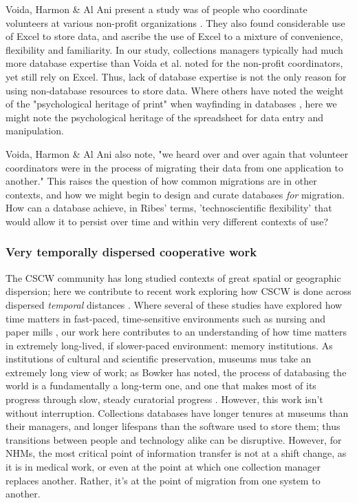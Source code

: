 Voida, Harmon & Al Ani present a study was of people who coordinate volunteers at various non-profit organizations \cite{voida2011homebrew}. They also found considerable use of Excel to store data, and ascribe the use of Excel to a mixture of convenience, flexibility and familiarity. In our study, collections managers typically had much more database expertise than Voida et al. noted for the non-profit coordinators, yet still rely on Excel. Thus, lack of database expertise is not the only reason for using non-database resources to store data. Where others have noted the weight of the "psychological heritage of print" when wayfinding in databases \cite{Kerr_1990}, here we might note the psychological heritage of the spreadsheet for data entry and manipulation.

Voida, Harmon & Al Ani also note, "we heard over and over again that volunteer coordinators were in the process of migrating their data from one application to another." This raises the question of how common migrations are in other contexts, and how we might begin to design and curate databases \emph{for} migration. How can a database achieve, in Ribes' terms, 'technoscientific flexibility' \cite{ribes2014kernel} that would allow it to persist over time and within very different contexts of use?

\subsubsection{Very temporally dispersed cooperative work}

The CSCW community has long studied contexts of great spatial or geographic dispersion; here we contribute to recent work exploring how CSCW is done across dispersed \textit{temporal} distances \cite[e.g.]{Jackson_2011, Lindley_2015}. Where several of these studies have explored how time matters in fast-paced, time-sensitive environments such as nursing \cite{sarcevic2009information, Reddy_2006} and paper mills \cite{auramaki1996paperwork}, our work here contributes to an understanding of how time matters in extremely long-lived, if slower-paced environment: memory institutions. As institutions of cultural and scientific preservation, museums mus take an extremely long view of work; as Bowker has noted, the process of databasing the world is a fundamentally a long-term one, and one that makes most of its progress through slow, steady curatorial progress \cite{Bowker_2000}. However, this work isn't without interruption. Collections databases have longer tenures at museums than their managers, and longer lifespans than the software used to store them; thus transitions between people and technology alike can be disruptive. However, for NHMs, the most critical point of information transfer is not at a shift change, as it is in medical work, or even at the point at which one collection manager replaces another. Rather, it's at the point of migration from one system to another.

